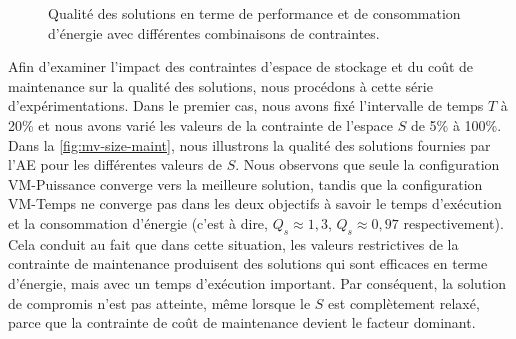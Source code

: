 \begin{figure}
  \centering
  \quad
  \caption{Qualité des solutions en terme de performance et de consommation d'énergie avec différentes combinaisons de contraintes.}\label{fig:mv-const-combined}
\end{figure}

Afin d'examiner l'impact des contraintes d'espace de stockage et du coût de maintenance sur la qualité des solutions, nous procédons à cette série d'expérimentations. Dans le premier cas, nous avons fixé l'intervalle de temps $T$ à 20\% et nous avons varié les valeurs de la contrainte de l'espace $S$ de 5\% à 100\%. Dans la \ref{fig:mv-size-maint}, nous illustrons la qualité des solutions fournies par l'AE pour les différentes valeurs de $S$. Nous observons que seule la configuration VM-Puissance converge vers la meilleure solution, tandis que la configuration VM-Temps ne converge pas dans les deux objectifs à savoir le temps d'exécution et la consommation d'énergie (c'est à dire, $Q_s \approx 1,3$, $Q_s \approx 0,97$ respectivement). Cela conduit au fait que dans cette situation, les valeurs restrictives de la contrainte de maintenance produisent des solutions qui sont efficaces en terme d'énergie, mais avec un temps d'exécution important. Par conséquent, la solution de compromis n'est pas atteinte, même lorsque le $S$ est complètement relaxé, parce que la contrainte de coût de maintenance devient le facteur dominant.


